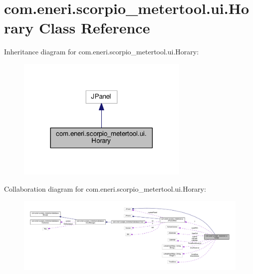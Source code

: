 \hypertarget{classcom_1_1eneri_1_1scorpio__metertool_1_1ui_1_1_horary}{}\section{com.\+eneri.\+scorpio\+\_\+metertool.\+ui.\+Horary Class Reference}
\label{classcom_1_1eneri_1_1scorpio__metertool_1_1ui_1_1_horary}


Inheritance diagram for com.\+eneri.\+scorpio\+\_\+metertool.\+ui.\+Horary\+:
\nopagebreak
\begin{figure}[H]
\begin{center}
\leavevmode
\includegraphics[width=233pt]{classcom_1_1eneri_1_1scorpio__metertool_1_1ui_1_1_horary__inherit__graph}
\end{center}
\end{figure}


Collaboration diagram for com.\+eneri.\+scorpio\+\_\+metertool.\+ui.\+Horary\+:
\nopagebreak
\begin{figure}[H]
\begin{center}
\leavevmode
\includegraphics[width=350pt]{classcom_1_1eneri_1_1scorpio__metertool_1_1ui_1_1_horary__coll__graph}
\end{center}
\end{figure}
